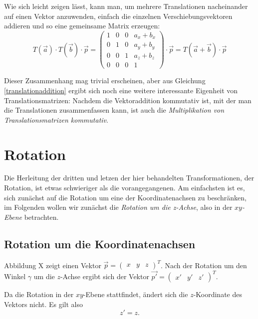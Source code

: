 Wie sich leicht zeigen lässt, kann man, um mehrere Translationen nacheinander auf einen Vektor anzuwenden, einfach die einzelnen Verschiebungsvektoren addieren und so eine gemeinsame Matrix erzeugen:
\begin{equation}
 \label{translationaddition}
 T{(\vec a)} \cdot T{(\vec b)} \cdot \vec p = 
 \begin{pmatrix}
  1 & 0 & 0 & a_x + b_x \\
  0 & 1 & 0 & a_y + b_y \\
  0 & 0 & 1 & a_z + b_z \\
  0 & 0 & 0 & 1
 \end{pmatrix} \cdot \vec p = T{(\vec a + \vec b)} \cdot \vec p
\end{equation}

Dieser Zusammenhang mag trivial erscheinen, aber aus Gleichung \ref{translationaddition} ergibt sich noch eine weitere interessante Eigenheit von Translationsmatrizen: Nachdem die Vektoraddition kommutativ ist, mit der man die Translationen zusammenfassen kann, ist auch die \emph{Multiplikation von Translationsmatrizen kommutativ}.

\section{Rotation}
Die Herleitung der dritten und letzen der hier behandelten Transformationen, der Rotation, ist etwas schwieriger als die vorangegangenen. Am einfachsten ist es, sich zunächst auf die Rotation um eine der Koordinatenachsen zu beschränken, im Folgenden wollen wir zunächst die \emph{Rotation um die z-Achse}, also in der \emph{$xy$-Ebene} betrachten.

\subsection{Rotation um die Koordinatenachsen}
Abbildung X zeigt einen Vektor $\vec p = \begin{pmatrix} x & y & z \end{pmatrix}^T$. Nach der Rotation um den Winkel $\gamma$ um die $z$-Achse ergibt sich der Vektor $\vec{p'} = \begin{pmatrix} x' & y' & z' \end{pmatrix}^T$.

Da die Rotation in der $xy$-Ebene stattfindet, ändert sich die $z$-Koordinate des Vektors nicht. Es gilt also
\begin{equation}
 z' = z.
\end{equation}

